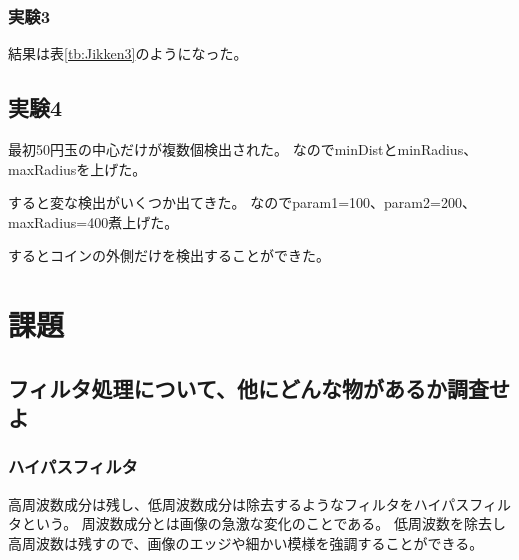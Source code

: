 \documentclass{jlreq}
\begin{document}
\subsubsection{実験3}
結果は表\ref{tb:Jikken3}のようになった。
\begin{table}[htbp]
	\centering
	\caption{実験3の結果}
\end{table}

\subsection{実験4}
最初50円玉の中心だけが複数個検出された。
なのでminDistとminRadius、maxRadiusを上げた。

すると変な検出がいくつか出てきた。
なのでparam1=100、param2=200、maxRadius=400煮上げた。

するとコインの外側だけを検出することができた。

\section{課題}
\subsection{フィルタ処理について、他にどんな物があるか調査せよ\cite{highpath}}
\subsubsection{ハイパスフィルタ}
高周波数成分は残し、低周波数成分は除去するようなフィルタをハイパスフィルタという。
周波数成分とは画像の急激な変化のことである。
低周波数を除去し高周波数は残すので、画像のエッジや細かい模様を強調することができる。
\end{document}
